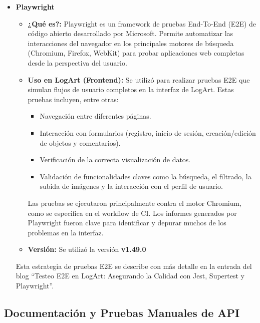 \begin{itemize}
\begin{itemize}
                \item \textbf{Versión:} Se utilizó la versión \textbf{v.7.0.0}
            \end{itemize}
        \vspace{0.3cm}
        \item \textbf{Playwright}
            \begin{itemize}
                \item \textbf{¿Qué es?:} Playwright es un framework de pruebas End-To-End (E2E) de código abierto desarrollado por Microsoft. Permite automatizar las interacciones del navegador en los principales motores de búsqueda (Chromium, Firefox, WebKit) para probar aplicaciones web completas desde la perspectiva del usuario. \cite{luxequalityPlaywrightE2E}
                \item \textbf{Uso en LogArt (Frontend):} Se utilizó para realizar pruebas E2E que simulan flujos de usuario completos en la interfaz de LogArt. Estas pruebas incluyen, entre otras:
                    \begin{itemize}
                        \item Navegación entre diferentes páginas.
                        \item Interacción con formularios (registro, inicio de sesión, creación/edición de objetos y comentarios).
                        \item Verificación de la correcta visualización de datos.
                        \item Validación de funcionalidades claves como la búsqueda, el filtrado, la subida de imágenes y la interacción con el perfil de usuario.
                    \end{itemize}
                Las pruebas se ejecutaron principalmente contra el motor Chromium, como se especifica en el workflow de CI. Los informes generados por Playwright fueron clave para identificar y depurar muchos de los problemas en la interfaz.
                \item \textbf{Versión:} Se utilizó la versión \textbf{v1.49.0}
            \end{itemize}
            Esta estrategia de pruebas E2E se describe con más detalle en la entrada del blog ``Testeo  E2E en LogArt: Asegurando la Calidad con Jest, Supertest y Playwright''\cite{MorenoTesteoLogArt}.
    \end{itemize}

\subsection{Documentación y Pruebas Manuales de API}
\label{sec:docuPruebasApi}

